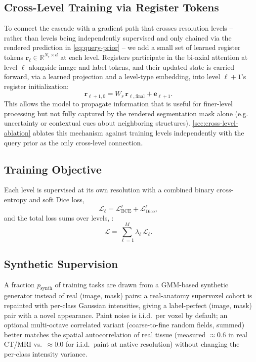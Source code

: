 \subsection{Cross-Level Training via Register Tokens}
\label{sec:registers}

To connect the cascade with a gradient path that crosses resolution
levels -- rather than levels being independently supervised and only
chained via the rendered prediction in \cref{eq:query-prior} -- we add a
small set of learned register tokens $\mathbf{r}_\ell \in \mathbb{R}^{N_r \times d}$
at each level. Registers participate in the bi-axial attention at level
$\ell$ alongside image and label tokens, and their updated state is
carried forward, via a learned projection and a level-type embedding,
into level $\ell+1$'s register initialization:
\begin{equation}
  \mathbf{r}_{\ell+1,0} = W_r\, \mathbf{r}_{\ell,\text{final}} + \mathbf{e}_{\ell+1}.
  \label{eq:register-carry}
\end{equation}
This allows the model to propagate information that is useful for
finer-level processing but not fully captured by the rendered
segmentation mask alone (e.g. uncertainty or contextual cues about
neighboring structures). \cref{sec:cross-level-ablation} ablates this
mechanism against training levels independently with the query prior as
the only cross-level connection.

\subsection{Training Objective}
\label{sec:objective}

Each level is supervised at its own resolution with a combined
binary cross-entropy and soft Dice loss,
\begin{equation}
  \mathcal{L}_\ell = \mathcal{L}_{\text{BCE}}^\ell + \mathcal{L}_{\text{Dice}}^\ell,
\end{equation}
and the total loss sums over levels, :
\begin{equation}
  \mathcal{L} = \sum_{\ell=1}^{M} \lambda_\ell\, \mathcal{L}_\ell.
\end{equation}

\subsection{Synthetic Supervision}
\label{sec:synth}

A fraction $p_{\text{synth}}$ of training tasks are drawn from a
GMM-based synthetic generator instead of real (image, mask) pairs: a
real-anatomy supervoxel cohort is repainted with per-class Gaussian
intensities, giving a label-perfect (image, mask) pair with a novel
appearance. Paint noise is i.i.d.\ per voxel by default; an optional
multi-octave correlated variant (coarse-to-fine random fields, summed)
better matches the spatial autocorrelation of real tissue (measured
$\approx 0.6$ in real CT/MRI vs.\ $\approx 0.0$ for i.i.d.\ paint at
native resolution) without changing the per-class intensity variance.
